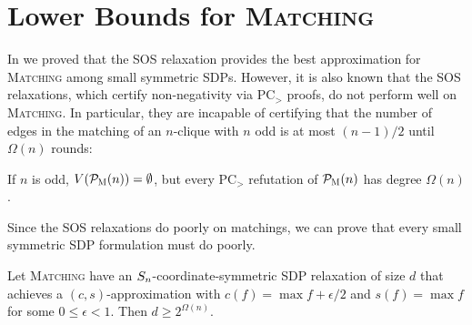 \section{Lower Bounds for \textsc{Matching}}
In  we proved that the SOS relaxation provides the best approximation for \textsc{Matching} among small symmetric SDPs. However, it is also known that the SOS relaxations, which certify non-negativity via PC$_>$ proofs, do not perform well on \textsc{Matching}. In particular, they are incapable of certifying that the number of edges in the matching of an $n$-clique with $n$ odd is at most $(n-1)/2$ until $\Omega(n)$ rounds:
\begin{theorem}\label{thm:grigoriev}
If $n$ is odd, $V(\mathcal P_{\textsc{M}}(n)) = \emptyset$, but every PC$_>$ refutation of $\mathcal P_{\textsc{M}}(n)$ has degree $\Omega(n)$.
\end{theorem}
Since the SOS relaxations do poorly on matchings, we can prove that every small symmetric SDP formulation must do poorly.
\begin{theorem}
Let \textsc{Matching} have an $S_{n}$-coordinate-symmetric SDP relaxation of size $d$ that achieves a $(c,s)$-approximation with $c(f) = \max f + \epsilon/2$ and $s(f) = \max f$ for some $0 \leq \epsilon < 1$. Then $d \geq 2^{\Omega(n)}$.
\end{theorem}
